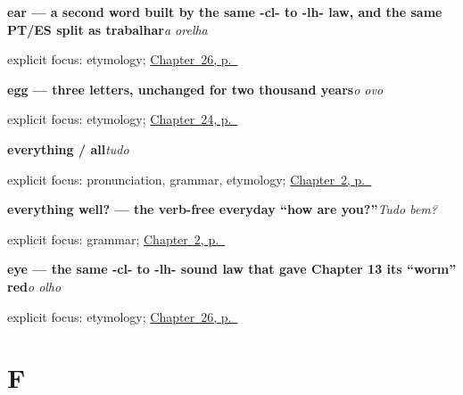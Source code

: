 \noindent\begin{minipage}[t]{\linewidth}
\raggedright
\textbf{ear — a second word built by the same -cl- to -lh- law, and the same PT/ES split as trabalhar}\enspace\emph{a orelha}\par
\footnotesize explicit focus: etymology; \hyperref[ch:pt-body-how-are-you]{Chapter~26, p.~\pageref*{ch:pt-body-how-are-you}}
\end{minipage}\par\smallskip

\noindent\begin{minipage}[t]{\linewidth}
\raggedright
\textbf{egg — three letters, unchanged for two thousand years}\enspace\emph{o ovo}\par
\footnotesize explicit focus: etymology; \hyperref[ch:pt-cheese-egg-rice-sugar]{Chapter~24, p.~\pageref*{ch:pt-cheese-egg-rice-sugar}}
\end{minipage}\par\smallskip

\noindent\begin{minipage}[t]{\linewidth}
\raggedright
\textbf{everything / all}\enspace\emph{tudo}\par
\footnotesize explicit focus: pronunciation, grammar, etymology; \hyperref[ch:pt-how-are-you]{Chapter~2, p.~\pageref*{ch:pt-how-are-you}}
\end{minipage}\par\smallskip

\noindent\begin{minipage}[t]{\linewidth}
\raggedright
\textbf{everything well? — the verb-free everyday “how are you?”}\enspace\emph{Tudo bem?}\par
\footnotesize explicit focus: grammar; \hyperref[ch:pt-how-are-you]{Chapter~2, p.~\pageref*{ch:pt-how-are-you}}
\end{minipage}\par\smallskip

\noindent\begin{minipage}[t]{\linewidth}
\raggedright
\textbf{eye — the same -cl- to -lh- sound law that gave Chapter 13 its \textquotedblleft{}worm\textquotedblright{} red}\enspace\emph{o olho}\par
\footnotesize explicit focus: etymology; \hyperref[ch:pt-body-how-are-you]{Chapter~26, p.~\pageref*{ch:pt-body-how-are-you}}
\end{minipage}\par\smallskip

\section*{F}

